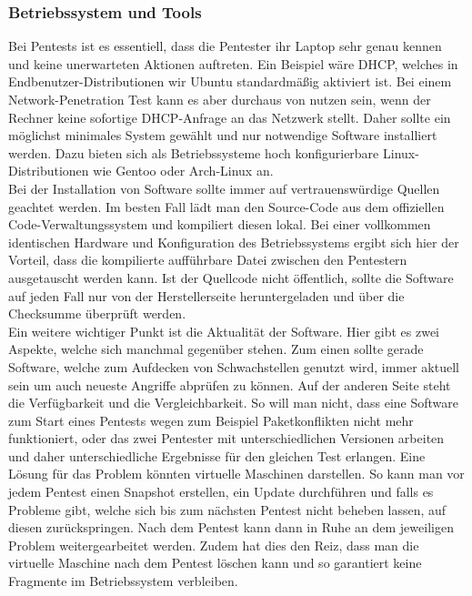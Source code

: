 		\subsubsection{Betriebssystem und Tools}
		Bei Pentests ist es essentiell, dass die Pentester ihr Laptop sehr genau kennen und keine unerwarteten Aktionen auftreten. Ein Beispiel wäre DHCP, welches in Endbenutzer-Distributionen wir Ubuntu standardmäßig aktiviert ist. Bei einem Network-Penetration Test kann es aber durchaus von nutzen sein, wenn der Rechner keine sofortige DHCP-Anfrage an das Netzwerk stellt. Daher sollte ein möglichst minimales System gewählt und nur notwendige Software installiert werden. Dazu bieten sich als Betriebssysteme hoch konfigurierbare Linux-Distributionen wie Gentoo oder Arch-Linux an.\\
		 
		Bei der Installation von Software sollte immer auf vertrauenswürdige Quellen geachtet werden. Im besten Fall lädt man den Source-Code aus dem offiziellen Code-Verwaltungssystem und kompiliert diesen lokal. Bei einer vollkommen identischen Hardware und Konfiguration des Betriebssystems ergibt sich hier der Vorteil, dass die kompilierte aufführbare Datei zwischen den Pentestern ausgetauscht werden kann. Ist der Quellcode nicht öffentlich, sollte die Software auf jeden Fall nur von der Herstellerseite heruntergeladen und über die Checksumme überprüft werden.\\
		
		Ein weitere wichtiger Punkt ist die Aktualität der Software. Hier gibt es zwei Aspekte, welche sich manchmal gegenüber stehen. Zum einen sollte gerade Software, welche zum Aufdecken von Schwachstellen genutzt wird, immer aktuell sein um auch neueste Angriffe abprüfen zu können. Auf der anderen Seite steht die Verfügbarkeit und die Vergleichbarkeit. So will man nicht, dass eine Software zum Start eines Pentests wegen zum Beispiel Paketkonflikten nicht mehr funktioniert, oder das zwei Pentester mit unterschiedlichen Versionen arbeiten und daher unterschiedliche Ergebnisse für den gleichen Test erlangen. Eine Lösung für das Problem könnten virtuelle Maschinen darstellen. So kann man vor jedem Pentest einen Snapshot erstellen, ein Update durchführen und falls es Probleme gibt, welche sich bis zum nächsten Pentest nicht beheben lassen, auf diesen zurückspringen. Nach dem Pentest kann dann in Ruhe an dem jeweiligen Problem weitergearbeitet werden. Zudem hat dies den Reiz, dass man die virtuelle Maschine nach dem Pentest löschen kann und so garantiert keine Fragmente im Betriebssystem verbleiben.\\
		
